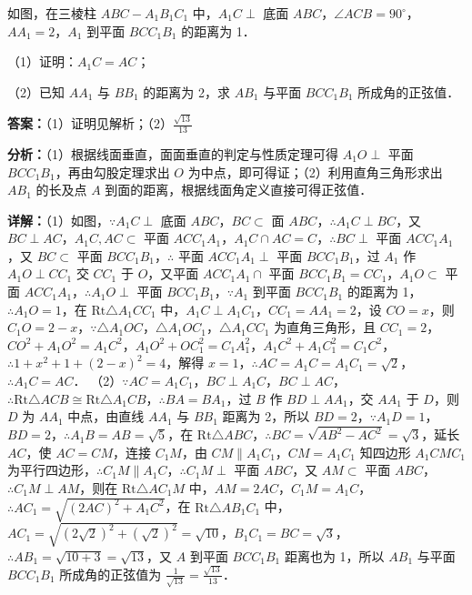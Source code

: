 \begin{question}[points=12]
如图，在三棱柱 $ABC-A_1B_1C_1$ 中，$A_1C \perp$ 底面 $ABC$，$\angle ACB = 90^\circ$，$AA_1 = 2$，$A_1$ 到平面 $BCC_1B_1$ 的距离为 1．

（1）证明：$A_1C = AC$；

（2）已知 $AA_1$ 与 $BB_1$ 的距离为 2，求 $AB_1$ 与平面 $BCC_1B_1$ 所成角的正弦值．
\begin{solution}
\textbf{答案：}（1）证明见解析；（2）$\frac{\sqrt{13}}{13}$

\textbf{分析：}（1）根据线面垂直，面面垂直的判定与性质定理可得 $A_1O \perp$ 平面 $BCC_1B_1$，再由勾股定理求出 $O$ 为中点，即可得证；（2）利用直角三角形求出 $AB_1$ 的长及点 $A$ 到面的距离，根据线面角定义直接可得正弦值．

\textbf{详解：}（1）如图，$\because A_1C \perp$ 底面 $ABC$，$BC \subset$ 面 $ABC$，$\therefore A_1C \perp BC$，又 $BC \perp AC$，$A_1C, AC \subset$ 平面 $ACC_1A_1$，$A_1C \cap AC = C$，$\therefore BC \perp$ 平面 $ACC_1A_1$，又 $BC \subset$ 平面 $BCC_1B_1$，$\therefore$ 平面 $ACC_1A_1 \perp$ 平面 $BCC_1B_1$，过 $A_1$ 作 $A_1O \perp CC_1$ 交 $CC_1$ 于 $O$，又平面 $ACC_1A_1 \cap$ 平面 $BCC_1B_1 = CC_1$，$A_1O \subset$ 平面 $ACC_1A_1$，$\therefore A_1O \perp$ 平面 $BCC_1B_1$，$\because A_1$ 到平面 $BCC_1B_1$ 的距离为 1，$\therefore A_1O = 1$，在 $\mathrm{Rt}\triangle A_1CC_1$ 中，$A_1C \perp A_1C_1$，$CC_1 = AA_1 = 2$，设 $CO = x$，则 $C_1O = 2-x$，$\because \triangle A_1OC$，$\triangle A_1OC_1$，$\triangle A_1CC_1$ 为直角三角形，且 $CC_1=2$，$CO^2+A_1O^2 = A_1C^2$，$A_1O^2+OC_1^2 = C_1A_1^2$，$A_1C^2+A_1C_1^2 = C_1C^2$，$\therefore 1+x^2+1+(2-x)^2 = 4$，解得 $x=1$，$\therefore AC = A_1C = A_1C_1 = \sqrt{2}$，$\therefore A_1C = AC$．
（2）$\because AC = A_1C_1$，$BC \perp A_1C$，$BC \perp AC$，$\therefore \mathrm{Rt}\triangle ACB \cong \mathrm{Rt}\triangle A_1CB$，$\therefore BA = BA_1$，过 $B$ 作 $BD \perp AA_1$，交 $AA_1$ 于 $D$，则 $D$ 为 $AA_1$ 中点，由直线 $AA_1$ 与 $BB_1$ 距离为 2，所以 $BD=2$，$\because A_1D=1$，$BD=2$，$\therefore A_1B = AB = \sqrt{5}$，在 $\mathrm{Rt}\triangle ABC$，$\therefore BC = \sqrt{AB^2-AC^2} = \sqrt{3}$，延长 $AC$，使 $AC=CM$，连接 $C_1M$，由 $CM \parallel A_1C_1$，$CM = A_1C_1$ 知四边形 $A_1CMC_1$ 为平行四边形，$\therefore C_1M \parallel A_1C$，$\therefore C_1M \perp$ 平面 $ABC$，又 $AM \subset$ 平面 $ABC$，$\therefore C_1M \perp AM$，则在 $\mathrm{Rt}\triangle AC_1M$ 中，$AM = 2AC$，$C_1M = A_1C$，$\therefore AC_1 = \sqrt{(2AC)^2+A_1C^2}$，在 $\mathrm{Rt}\triangle AB_1C_1$ 中，$AC_1 = \sqrt{(2\sqrt{2})^2+(\sqrt{2})^2} = \sqrt{10}$，$B_1C_1 = BC = \sqrt{3}$，$\therefore AB_1 = \sqrt{10+3} = \sqrt{13}$，又 $A$ 到平面 $BCC_1B_1$ 距离也为 1，所以 $AB_1$ 与平面 $BCC_1B_1$ 所成角的正弦值为 $\frac{1}{\sqrt{13}} = \frac{\sqrt{13}}{13}$．
\end{solution}
\end{question}

